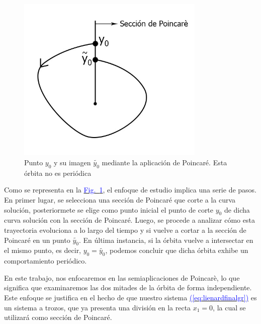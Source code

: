 \documentclass[12pt,a4paper]{report} %
\newcommand{\fref}[1]{\hyperref[#1]{\textcolor{blue}{Fig.~\ref*{#1}}}}
\newcommand{\eref}[1]{\hyperref[#1]{\textcolor{blue}{(\ref*{#1})}}}
\begin{document}
	\begin{figure}[h]
		\centering
		\includegraphics[width=0.8\textwidth]{aplipoincare2.jpg}
		\caption{Punto $y_0$ y su imagen $\tilde{y_0}$ mediante la aplicación de Poincaré. Esta órbita no es periódica}
		\label{fig:aplipoincare2}
	\end{figure}\smallskip

 Como se representa en la \fref{fig:aplipoincare2}, el enfoque de estudio implica una serie de pasos. En primer lugar, se selecciona una sección de Poincaré que corte a la curva solución, posteriormete se elige como punto inicial el punto de corte $y_0$ de dicha curva solución con la sección de Poincaré. Luego, se procede a analizar cómo esta trayectoria evoluciona a lo largo del tiempo y si vuelve a cortar a la sección de Poincaré en un punto $\tilde{y_0}$. En última instancia, si la órbita vuelve a intersectar en el mismo punto, es decir, $y_0=\tilde{y_0}$, podemos concluir que dicha órbita exhibe un comportamiento periódico.

	\newpage
	
	En este trabajo, nos enfocaremos en las semiaplicaciones de Poincarè, lo que significa que examinaremos las dos mitades de la órbita de forma independiente. Este enfoque se justifica en el hecho de que nuestro sistema \eref{eq:lienardfinalgr} es un sistema a trozos, que ya presenta una división en la recta $x_1=0$, la cual se utilizará como sección de Poincaré.
	
\end{document}
